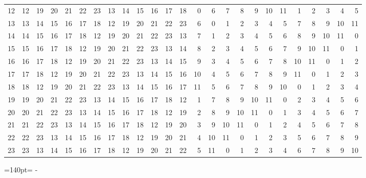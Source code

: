 \documentclass[10pt,a4paper]{article}
\newcommand{\needspace}[1]{\par\penalty-100\begingroup\dimen0=#1\relax\dimen2=\pagegoal
  \advance\dimen2-\pagetotal\ifdim\dimen0>\dimen2\relax\ifdim\dimen2>0pt\vfil\break\fi\fi
  \endgroup}
\numberwithin{equation}{section}
\begin{document}
{\begin{longtable}{@{}r|rrrrrrrrrrrrrrrrrrrrrrrr@{}}
12 & 12 & 19 & 20 & 21 & 22 & 23 & 13 & 14 & 15 & 16 & 17 & 18 & 0 & 6 & 7 & 8 & 9 & 10 & 11 & 1 & 2 & 3 & 4 & 5\\
13 & 13 & 14 & 15 & 16 & 17 & 18 & 12 & 19 & 20 & 21 & 22 & 23 & 6 & 0 & 1 & 2 & 3 & 4 & 5 & 7 & 8 & 9 & 10 & 11\\
14 & 14 & 15 & 16 & 17 & 18 & 12 & 19 & 20 & 21 & 22 & 23 & 13 & 7 & 1 & 2 & 3 & 4 & 5 & 6 & 8 & 9 & 10 & 11 & 0\\
15 & 15 & 16 & 17 & 18 & 12 & 19 & 20 & 21 & 22 & 23 & 13 & 14 & 8 & 2 & 3 & 4 & 5 & 6 & 7 & 9 & 10 & 11 & 0 & 1\\
16 & 16 & 17 & 18 & 12 & 19 & 20 & 21 & 22 & 23 & 13 & 14 & 15 & 9 & 3 & 4 & 5 & 6 & 7 & 8 & 10 & 11 & 0 & 1 & 2\\
17 & 17 & 18 & 12 & 19 & 20 & 21 & 22 & 23 & 13 & 14 & 15 & 16 & 10 & 4 & 5 & 6 & 7 & 8 & 9 & 11 & 0 & 1 & 2 & 3\\
18 & 18 & 12 & 19 & 20 & 21 & 22 & 23 & 13 & 14 & 15 & 16 & 17 & 11 & 5 & 6 & 7 & 8 & 9 & 10 & 0 & 1 & 2 & 3 & 4\\
19 & 19 & 20 & 21 & 22 & 23 & 13 & 14 & 15 & 16 & 17 & 18 & 12 & 1 & 7 & 8 & 9 & 10 & 11 & 0 & 2 & 3 & 4 & 5 & 6\\
20 & 20 & 21 & 22 & 23 & 13 & 14 & 15 & 16 & 17 & 18 & 12 & 19 & 2 & 8 & 9 & 10 & 11 & 0 & 1 & 3 & 4 & 5 & 6 & 7\\
21 & 21 & 22 & 23 & 13 & 14 & 15 & 16 & 17 & 18 & 12 & 19 & 20 & 3 & 9 & 10 & 11 & 0 & 1 & 2 & 4 & 5 & 6 & 7 & 8\\
22 & 22 & 23 & 13 & 14 & 15 & 16 & 17 & 18 & 12 & 19 & 20 & 21 & 4 & 10 & 11 & 0 & 1 & 2 & 3 & 5 & 6 & 7 & 8 & 9\\*
23 & 23 & 13 & 14 & 15 & 16 & 17 & 18 & 12 & 19 & 20 & 21 & 22 & 5 & 11 & 0 & 1 & 2 & 3 & 4 & 6 & 7 & 8 & 9 & 10\\
\bottomrule\end{longtable}}
\needspace{140pt}
\end{document}
